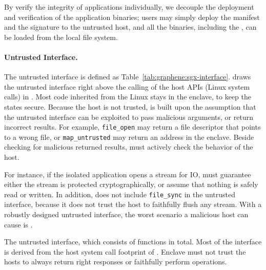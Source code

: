 By verify the integrity of applications individually,
we decouple the deployment and verification of the application binaries;
users may simply deploy the manifest and the signature to the untrusted host,
and all the binaries, including the \libos{}, can be loaded from the local file system.

\paragraph{Untrusted Interface.}
The untrusted interface is defined as Table~\ref{tab:graphene:sgx-interface}.
\graphenesgx{} draws the untrusted interface right above the calling
of the host APIs (Linux system calls) in \pal{}.
Most code inherited from the \graphene{} Linux \pal{} stays in
the enclave, to keep the states secure.
Because the host is not trusted,
\graphenesgx{} is built upon the assumption that the untrusted interface
can be exploited to
pass malicious arguments, or return incorrect results.
For example, {\tt file\_open} may return a file descriptor that points
to a wrong file, or {\tt map\_untrusted} may return an address in the enclave. 
Beside checking for malicious returned results,
\graphenesgx{} must actively check the behavior of the host.

For instance, if the isolated application opens a stream for IO,
\graphenesgx{} must guarantee either the stream is protected cryptographically,
or assume that nothing is safely read or written.
In addition, \graphenesgx{} does not include {\tt file\_sync} in the untrusted interface,
because it does not trust the host to faithfully flush any stream.
With a robustly designed untrusted interface,
the worst scenario a malicious host can cause is .


\begin{table}[t!]
\centering

\caption[The \graphenesgx{} untrusted interface]
{The \graphenesgx{} untrusted interface, which consists of \interfacenum{} functions in total.
Most of the interface is derived from the host system call footprint of
\graphene{} \libos{}. Enclave must not trust the hosts to
always return right responses or faithfully perform operations.}
\label{tab:graphene:sgx-interface}
\end{table}

